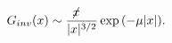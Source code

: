 \begin{equation}
G_{inv}(x) \sim \frac{\not\! x~~~}{|x|^{3/2}} \exp {(-\mu |x|)}.
\label{inv-asym}
\end{equation}

